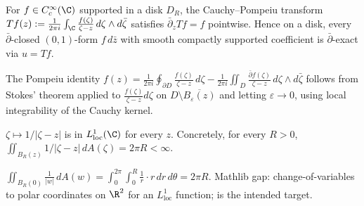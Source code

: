 \begin{lemma}
\label{lem:dpp-r2-pompeiu-formula}
For $f \in C^{\infty}_{c}(\C)$ supported in a disk $D_{R}$,
the Cauchy--Pompeiu transform
$Tf(z) := \frac{1}{2\pi i}\int_{\C} \frac{f(\zeta)}{\zeta - z}\,
d\zeta \wedge d\bar\zeta$
satisfies $\bar\partial_{z} Tf = f$ pointwise.  Hence on a disk,
every $\bar\partial$-closed $(0,1)$-form $f\,d\bar z$ with smooth
compactly supported coefficient is $\bar\partial$-exact via
$u = Tf$.
\leanok
\end{lemma}

\begin{lemma}
\label{lem:dpp-r3-stokes-on-disk}
The Pompeiu identity $f(z) = \frac{1}{2\pi i}\oint_{\partial D}
\frac{f(\zeta)}{\zeta - z}\,d\zeta - \frac{1}{2\pi i}\iint_{D}
\frac{\bar\partial f(\zeta)}{\zeta - z}\,d\zeta\wedge d\bar\zeta$
follows from Stokes' theorem applied to $\frac{f(\zeta)}{\zeta - z}
d\zeta$ on $D \setminus \overline{B_{\varepsilon}(z)}$ and
letting $\varepsilon \to 0$, using local integrability of the
Cauchy kernel.
\leanok
\end{lemma}

\begin{lemma}
\label{lem:dpp-r4-kernel-locint}
$\zeta \mapsto 1/|\zeta - z|$ is in $L^{1}_{\mathrm{loc}}(\C)$
for every $z$.  Concretely, for every $R > 0$,
$\iint_{B_{R}(z)} 1/|\zeta - z|\,dA(\zeta) = 2\pi R < \infty$.
\leanok\mathlibok
\end{lemma}

\begin{lemma}
\label{lem:dpp-r5-polar-volume}
$\iint_{B_{R}(0)} \frac{1}{|w|}\,dA(w) =
\int_{0}^{2\pi}\int_{0}^{R} \frac{1}{r} \cdot r\,dr\,d\theta
= 2\pi R$.  Mathlib gap: change-of-variables to polar
coordinates on $\R^{2}$ for an $L^{1}_{\mathrm{loc}}$ function;
 is the
intended target.
\leanok\mathlibok
\end{lemma}

